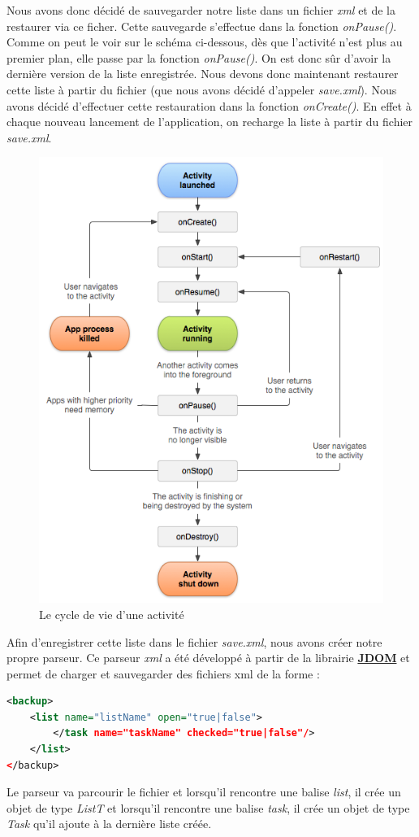 \documentclass[a4paper,10pt]{article}
\begin{document}
Nous avons donc décidé de sauvegarder notre liste dans un fichier \emph{xml} et de la restaurer via ce ficher. Cette sauvegarde s'effectue dans la fonction \emph{onPause()}. Comme on peut le voir sur le schéma ci-dessous, dès que l'activité n'est plus au premier plan, elle passe par la fonction \emph{onPause()}. On est donc sûr d'avoir la dernière version de la liste enregistrée.
Nous devons donc maintenant restaurer cette liste à partir du fichier (que nous avons décidé d'appeler \textit{save.xml}). Nous avons décidé d'effectuer cette restauration dans la fonction \emph{onCreate()}. En effet à chaque nouveau lancement de l'application, on recharge la liste à partir du fichier \textit{save.xml}.
\begin{figure}[htpb]
	\center
	\includegraphics[scale=0.45]{Images/activity_lifecycle.png}
	\caption{Le cycle de vie d'une activité}
\end{figure}

Afin d'enregistrer cette liste dans le fichier \emph{save.xml}, nous avons créer notre propre parseur.
Ce parseur \emph{xml} a été développé à partir de la librairie \href{http://www.jdom.org/}{\textbf{JDOM}} et permet de charger et sauvegarder des fichiers xml
de la forme :
\begin{lstlisting}[language=XML]
<backup>
	<list name="listName" open="true|false">
		</task name="taskName" checked="true|false"/>
	</list>
</backup>
\end{lstlisting}
Le parseur va parcourir le fichier et lorsqu'il rencontre une balise \emph{list}, il crée un objet de type \emph{ListT} et lorsqu'il rencontre une balise
\emph{task}, il crée un objet de type \emph{Task} qu'il ajoute à la dernière liste créée.
\end{document}
